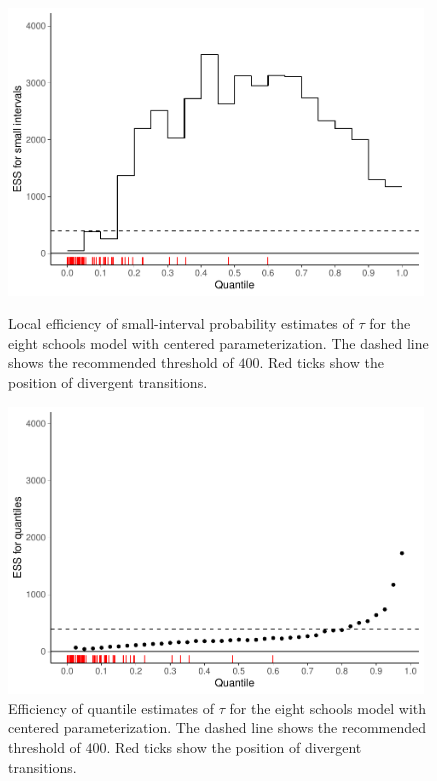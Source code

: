 \documentclass[american,]{article}
\theoremstyle{definition}
\begin{document}
\begin{figure}[tp]
  \centering
  \begin{minipage}{0.48\textwidth}
  \includegraphics[width=0.98\textwidth]{graphics/local-ess-fit-cp-1.pdf}
  \caption{Local efficiency of small-interval probability estimates of $\tau$ 
  for the eight schools model with centered parameterization. The dashed line shows the
    recommended threshold of $400$. Red ticks show 
  the position of divergent transitions.}
  \label{fig:local-ess-fit-cp-1}
\end{minipage}
\hfill
  \begin{minipage}{0.48\textwidth}
  \includegraphics[width=0.98\textwidth]{graphics/quantile-ess-fit-cp-1.pdf}
  \caption{Efficiency of quantile estimates of $\tau$ for the eight schools
  model with centered parameterization. The dashed line shows the
    recommended threshold of $400$. Red ticks show the position of
  divergent transitions.\\~}
  \label{fig:quantile-ess-fit-cp-1}
 \end{minipage}
\end{figure}
\end{document}
